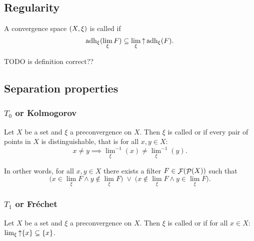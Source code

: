 \subsection{Regularity}
\begin{definition}
A convergence space $\left( X,\xi \right)$ is called  if
\[ \operatorname{adh}_\xi(\lim_\xi F) \subseteq \lim_\xi \mathop{\uparrow} \operatorname{adh}_\xi(F).   \]
\end{definition}
TODO is definition correct??

\subsection{Separation properties}
\subsubsection{$T_0$ or Kolmogorov}
\begin{definition}
Let $X$ be a set and $\xi$ a preconvergence on $X$. Then $\xi$ is called  or  if every pair of points in $X$ is distinguishable, that is for all $x,y\in X$:
\[ x\neq y \implies {\lim_\xi}^{-1}(x) \neq {\lim_\xi}^{-1}(y). \]
\end{definition}

In orther words, for all $x,y \in X$ there exists a filter $F \in \mathop{\mathcal{F}}(\mathop{\mathcal{P}}(X))$ such that
\[ \Big(x\in \lim_\xi F \land y\notin \lim_\xi F\Big)\;\lor\; \Big(x\notin \lim_\xi F \land y\in \lim_\xi F\Big). \]

\subsubsection{$T_1$ or Fréchet}
\begin{definition}
Let $X$ be a set and $\xi$ a preconvergence on $X$. Then $\xi$ is called  or  if for all $x\in X$: $\lim_\xi \mathop{\uparrow}\{x\} \subseteq \{x\}$.
\end{definition}

